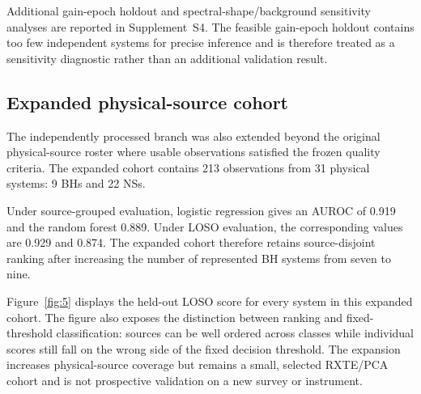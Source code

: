 \documentclass[final,5p,authoryear,nopreprintline]{elsarticle}
\begin{document}
Additional gain-epoch holdout and spectral-\allowbreak shape/\allowbreak background sensitivity analyses are reported in Supplement~S4. The feasible gain-epoch holdout contains too few independent systems for precise inference and is therefore treated as a sensitivity diagnostic rather than an additional validation result.

\subsection{Expanded physical-source cohort}

The independently processed branch was also extended beyond the original physical-source roster where usable observations satisfied the frozen quality criteria. The expanded cohort contains 213 observations from 31 physical systems: 9 BHs and 22 NSs.

Under source-grouped evaluation, logistic regression gives an AUROC of 0.919 and the random forest 0.889. Under LOSO evaluation, the corresponding values are 0.929 and 0.874. The expanded cohort therefore retains source-disjoint ranking after increasing the number of represented BH systems from seven to nine.

Figure~\ref{fig:5} displays the held-out LOSO score for every system in this expanded cohort. The figure also exposes the distinction between ranking and fixed-threshold classification: sources can be well ordered across classes while individual scores still fall on the wrong side of the fixed decision threshold. The expansion increases physical-source coverage but remains a small, selected RXTE/PCA cohort and is not prospective validation on a new survey or instrument.
\end{document}
